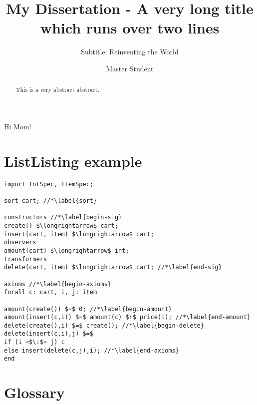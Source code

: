 \documentclass[mscthesis, 11pt]{usiinfthesis}
\title{My Dissertation - A very long title\\ which runs over two
  lines} %
\subtitle{Subtitle: Reinventing the World} %
\author{Master Student} %
\begin{document}
\maketitle %

\frontmatter %

\begin{abstract}
This is a very abstract abstract. 
\end{abstract}


\begin{acknowledgements}
	Hi Mom!
\end{acknowledgements}

\tableofcontents 
\listoffigures %
\listoftables %

\mainmatter













\chapter{ListListing example}
\begin{lstlisting}
import IntSpec, ItemSpec;

sort cart; //*\label{sort}

constructors //*\label{begin-sig}
create() $\longrightarrow$ cart;
insert(cart, item) $\longrightarrow$ cart;
observers
amount(cart) $\longrightarrow$ int;
transformers
delete(cart, item) $\longrightarrow$ cart; //*\label{end-sig}

axioms //*\label{begin-axioms}
forall c: cart, i, j: item 

amount(create()) $=$ 0; //*\label{begin-amount}
amount(insert(c,i)) $=$ amount(c) $+$ price(i); //*\label{end-amount}
delete(create(),i) $=$ create(); //*\label{begin-delete}
delete(insert(c,i),j) $=$
if (i =$\:$= j) c
else insert(delete(c,j),i); //*\label{end-axioms}
end
\end{lstlisting}



\backmatter

\chapter{Glossary} %

%
%



\lipsum
\end{document}
